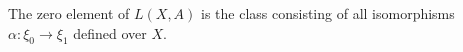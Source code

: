 The zero element of $L(X, A)$ is the class consisting of all isomorphisms $\alpha: \xi_0 \rightarrow \xi_1$ defined over $X$.